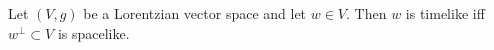 Let $(V, g)$ be a Lorentzian vector space and let $w \in V$. Then $w$ is timelike iff $w^\perp \subset V$ is spacelike.
